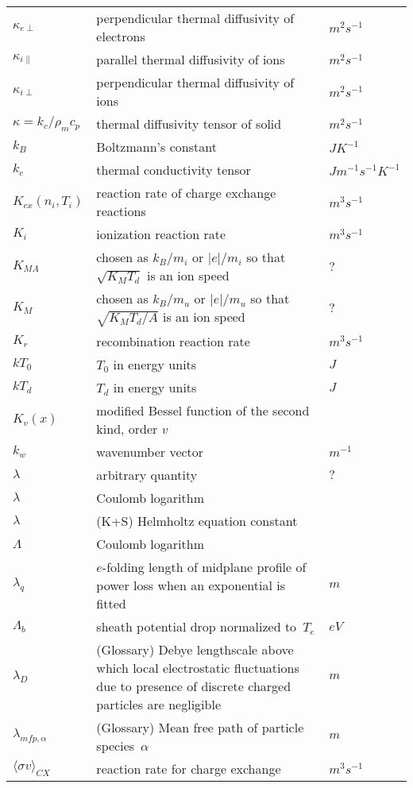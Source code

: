 \begin{longtable}{|p{3.0cm}|p{10.0cm}|p{3.0cm}|}
$\kappa_{e\perp}$ & perpendicular thermal diffusivity of electrons & $m^2 s^{-1}$ \\
$\kappa_{i\|}$ & parallel thermal diffusivity of ions & $m^2 s^{-1}$ \\
$\kappa_{i\perp}$ & perpendicular thermal diffusivity of ions & $m^2 s^{-1}$ \\
$\kappa=k_c/\rho_m c_p$ & thermal diffusivity tensor of solid & $m^2 s^{-1}$ \\
$k_B$ & Boltzmann's constant  & $J K^{-1}$ \\
$k_c$ & thermal conductivity tensor  & $J m^{-1} s^{-1} K^{-1}$ \\
$K_{cx}\left( n_i, T_i \right)$ & reaction rate of charge exchange reactions  & $m^3 s^{-1}$ \\
$K_i$ & ionization reaction rate  & $m^3 s^{-1}$ \\
$K_{MA}$ & chosen as $k_B/m_i$ or $|e|/m_i$ so that $\sqrt{K_MT_d}$ is an ion speed & $?$ \\
$K_M$ & chosen as $k_B/m_u$ or $|e|/m_u$ so that $\sqrt{K_MT_d/A}$ is an ion speed & $?$ \\
$K_r$ & recombination reaction rate  & $m^3 s^{-1}$ \\
$kT_0$ & $T_0$ in energy units  & $J$ \\
$kT_d$ & $T_d$ in energy units  & $J$ \\
$K_v(x)$ & modified Bessel function of the second kind, order $v$  & \\
$k_w$ & wavenumber vector & $m^{-1}$ \\
$\lambda$ & arbitrary quantity  & $?$ \\
$\lambda$ & Coulomb logarithm & \\
$\lambda$ &  (K+S) Helmholtz equation constant & \\
$\Lambda$ & Coulomb logarithm & \\
$\lambda_q$ & $e$-folding length of midplane profile of power loss when an exponential is fitted & $m$ \\
$\Lambda_b$ & sheath potential drop normalized to~$T_e$  & $eV$ \\
$\lambda_D$ & (Glossary) Debye lengthscale above which local electrostatic fluctuations due to presence of discrete charged particles are negligible  & $m$ \\
$\lambda_{mfp,\alpha}$ & (Glossary) Mean free path of particle species~$\alpha$ & $m$  \\
$\langle \sigma v \rangle_{CX}$ & reaction rate for charge exchange  & $m^3 s^{-1}$ \\

\end{longtable}
